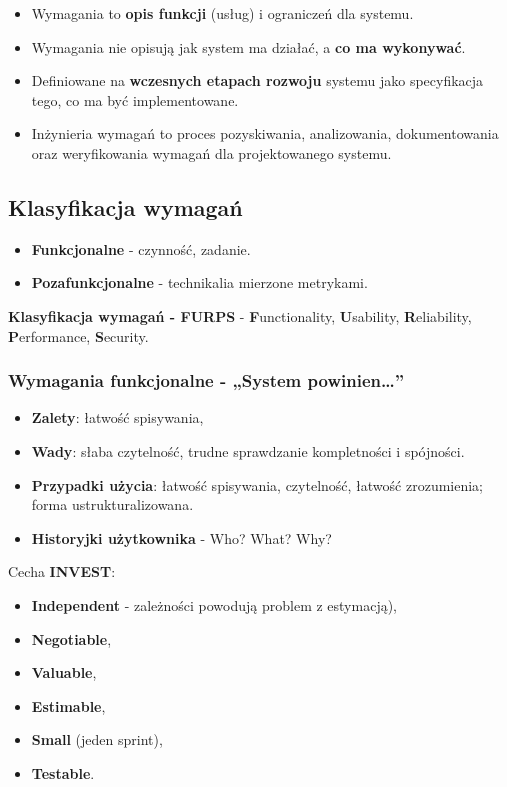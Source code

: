 \documentclass[../main.tex]{subfiles}
\begin{document}
    \begin{itemize}
        \item Wymagania to \textbf{opis funkcji} (usług) i ograniczeń dla systemu.
        \item Wymagania nie opisują jak system ma działać, a \textbf{co ma
        wykonywać}.
        \item Definiowane na \textbf{wczesnych etapach rozwoju} systemu jako specyfikacja tego, co ma być
        implementowane.
        \item Inżynieria wymagań to proces pozyskiwania, analizowania, dokumentowania oraz weryfikowania
        wymagań dla projektowanego systemu.

    \end{itemize}

    \subsection{Klasyfikacja wymagań}
    \begin{itemize}
        \item \textbf{Funkcjonalne} - czynność, zadanie.
        \item \textbf{Pozafunkcjonalne} - technikalia mierzone metrykami.
    \end{itemize}

    \textbf{Klasyfikacja wymagań - FURPS} - \textbf{F}unctionality, \textbf{U}sability, \textbf{R}eliability,
    \textbf{P}erformance, \textbf{S}ecurity.

    \subsubsection{Wymagania funkcjonalne - „System powinien\dots”}
    \begin{itemize}
        \item \textbf{Zalety}: łatwość spisywania,
        \item \textbf{Wady}: słaba czytelność, trudne sprawdzanie kompletności i spójności.
        \item \textbf{Przypadki użycia}: łatwość spisywania, czytelność, łatwość zrozumienia; forma ustrukturalizowana.
        \item \textbf{Historyjki użytkownika} - Who? What? Why?
    \end{itemize}

    Cecha \textbf{INVEST}:
    \begin{itemize}
        \item \textbf{Independent} - zależności powodują problem z estymacją),
        \item \textbf{Negotiable},
        \item \textbf{Valuable},
        \item \textbf{Estimable},
        \item \textbf{Small} (jeden sprint),
        \item \textbf{Testable}.
    \end{itemize}
\end{document}
